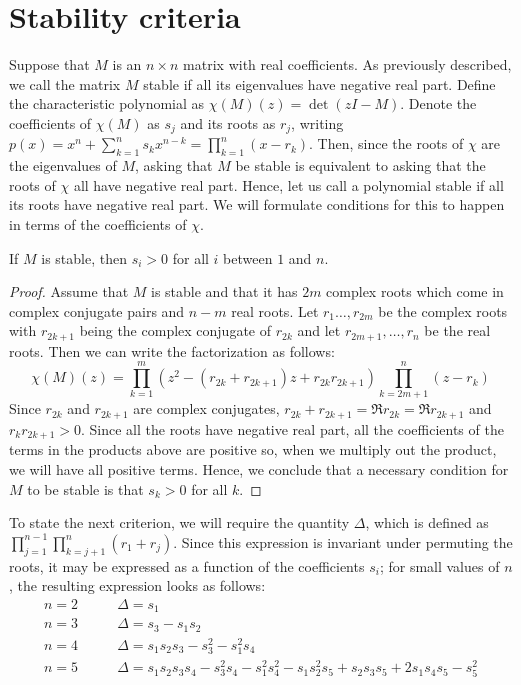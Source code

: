 \section{Stability criteria}
Suppose that $M$ is an $n \times n$ matrix with real coefficients.
As previously described, we call
the matrix $M$ stable if all its eigenvalues have negative real part.
Define the characteristic polynomial as $\chi(M)(z) = \det(zI - M)$.
Denote the coefficients of $\chi(M)$ as $s_j$ and its roots as $r_j$,
writing $p(x) = x^n + \sum_{k=1}^n s_k x^{n-k} = \prod_{k=1}^n (x-r_k)$.
Then, since the roots of $\chi$ are the eigenvalues of $M$, asking that
$M$ be stable is equivalent to asking that the roots of $\chi$ all have
negative real part.  Hence, let us call a polynomial stable if all its
roots have negative real part.  We will formulate conditions for this to
happen in terms of the coefficients of $\chi$.

\begin{lemma}
If $M$ is stable, then $s_i > 0$ for all $i$ between $1$ and $n$.
\end{lemma}

\begin{proof}
Assume that $M$ is stable and that it has $2m$ complex roots which come in
complex conjugate pairs and $n-m$ real roots.  Let $r_1 \ldots, r_{2m}$ be
the complex roots with $r_{2k+1}$ being the complex conjugate of $r_{2k}$
and let $r_{2m+1}, \ldots,  r_{n}$ be the real roots. Then we can write the
factorization as follows:
\[
\chi(M)(z) = \prod_{k=1}^{m} (z^2 - (r_{2k} + r_{2k+1}) z + r_{2k} r_{2k+1})
             \prod_{k=2m+1}^{n} (z - r_k)
\]
Since $r_{2k}$ and $r_{2k+1}$ are complex conjugates, $r_{2k} + r_{2k+1} =
\Re r_{2k} = \Re r_{2k+1}$ and $r_{k} r_{2k+1} > 0$.   Since all the
roots have negative real part, all the coefficients of the terms in
the products above are positive so, when we multiply out the product,
we will have all positive terms.  Hence, we conclude that a necessary
condition for $M$ to be stable is that $s_k > 0$ for all $k$.
\end{proof}

To state the next criterion, we will require the quantity $\Delta$, which
is defined as $\prod_{j=1}^{n-1} \prod_{k=j+1}^n (r_1 + r_j)$.  Since
this expression is invariant under permuting the roots, it may be expressed
as a function of the coefficients $s_i$; for small values of $n$, the
resulting expression looks as follows:
\begin{align*}
n=2 \qquad &\Delta = s_1 \\
n=3 \qquad &\Delta = s_3 - s_1 s_2 \\
n=4 \qquad &\Delta = s_1 s_2 s_3 - s_3^2 - s_1^2 s_4 \\
n=5 \qquad &\Delta = s_1 s_2 s_3 s_4 - s_3^2 s_4 - s_1^2 s_4^2 -
                     s_1 s_2^2 s_5 + s_2 s_3 s_5 + 2 s_1 s_4 s_5 - s_5^2
\end{align*}

